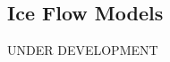 
\subsection{Ice Flow Models} \label{sec:using-issm-tutorials-iceflowmodels}
UNDER DEVELOPMENT

\clearpage %
